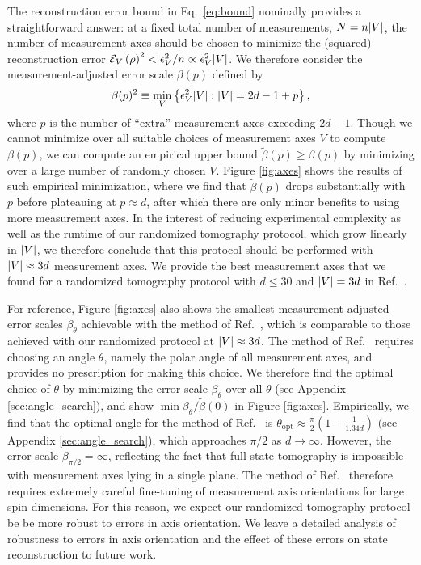 \documentclass[nofootinbib,twocolumn]{revtex4-1}
\renewcommand{\t}{\text} %
\newcommand{\p}[1]{\left(#1\right)} %
\renewcommand{\Set}[1]{\left\{#1\right\}} %
\newcommand{\E}{\mathcal{E}}
\begin{document}
The reconstruction error bound in Eq.~\eqref{eq:bound} nominally provides a straightforward answer: at a fixed total number of measurements, $N=n\abs{V}$, the number of measurement axes should be chosen to minimize the (squared) reconstruction error $\E_V\p{\rho}^2<\epsilon_V^2/n\propto\epsilon_V^2\abs{V}$.
We therefore consider the measurement-adjusted error scale $\beta(p)$ defined by
\begin{align}
  \beta(p)^2
  \equiv \min_V\Set{\epsilon_V^2\abs{V}:\abs{V}=2d-1+p},
\end{align}
where $p$ is the number of ``extra'' measurement axes exceeding $2d-1$.
Though we cannot minimize over all suitable choices of measurement axes $V$ to compute $\beta(p)$, we can compute an empirical upper bound $\tilde\beta(p)\ge\beta(p)$ by minimizing over a large number of randomly chosen $V$.
Figure \ref{fig:axes} shows the results of such empirical minimization, where we find that $\tilde\beta(p)$ drops substantially with $p$ before plateauing at $p\approx d$, after which there are only minor benefits to using more measurement axes.
In the interest of reducing experimental complexity as well as the runtime of our randomized tomography protocol, which grow linearly in $\abs{V}$, we therefore conclude that this protocol should be performed with $\abs{V}\approx3d$ measurement axes.
We provide the best measurement axes that we found for a randomized tomography protocol with $d\le30$ and $\abs{V}=3d$ in Ref.~\cite{tomo_codes}.

For reference, Figure \ref{fig:axes} also shows the smallest measurement-adjusted error scales $\beta_\theta$ achievable with the method of Ref.~\cite{newton1968measurability}, which is comparable to those achieved with our randomized protocol at $\abs{V}\approx3d$.
The method of Ref.~\cite{newton1968measurability} requires choosing an angle $\theta$, namely the polar angle of all measurement axes, and provides no prescription for making this choice.
We therefore find the optimal choice of $\theta$ by minimizing the error scale $\beta_\theta$ over all $\theta$ (see Appendix \ref{sec:angle_search}), and show $\min\beta_\theta/\tilde\beta(0)$ in Figure \ref{fig:axes}.
Empirically, we find that the optimal angle for the method of Ref.~\cite{newton1968measurability} is $\theta_{\t{opt}}\approx\frac{\pi}{2}(1-\frac1{1.34d})$ (see Appendix \ref{sec:angle_search}), which approaches $\pi/2$ as $d\to\infty$.
However, the error scale $\beta_{\pi/2}=\infty$, reflecting the fact that full state tomography is impossible with measurement axes lying in a single plane.
The method of Ref.~\cite{newton1968measurability} therefore requires extremely careful fine-tuning of measurement axis orientations for large spin dimensions.
For this reason, we expect our randomized tomography protocol be be more robust to errors in axis orientation.
We leave a detailed analysis of robustness to errors in axis orientation and the effect of these errors on state reconstruction to future work.
\end{document}
